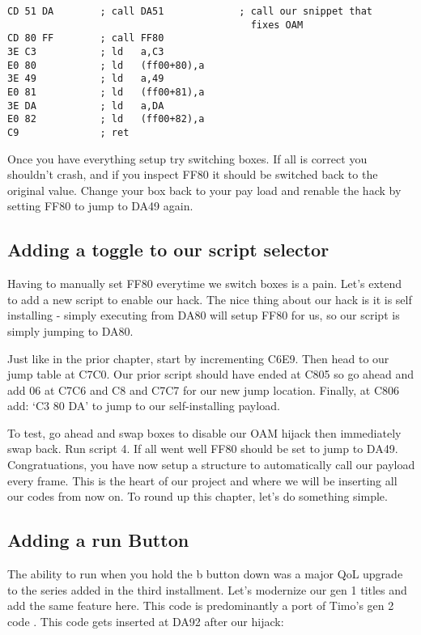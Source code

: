 \documentclass[../main.tex]{subfiles}
\begin{document}
    \begin{verbatim}
CD 51 DA        ; call DA51             ; call our snippet that
                                          fixes OAM
CD 80 FF        ; call FF80
3E C3           ; ld   a,C3
E0 80           ; ld   (ff00+80),a
3E 49           ; ld   a,49
E0 81           ; ld   (ff00+81),a
3E DA           ; ld   a,DA
E0 82           ; ld   (ff00+82),a
C9              ; ret  
    \end{verbatim}

    Once you have everything setup try switching boxes.  If all is correct you shouldn't crash, and if you inspect FF80 it should be switched back to the original value.  Change your box back to your pay load and renable the hack by setting FF80 to jump to DA49 again.

    \subsection{Adding a toggle to our script selector}
    Having to manually set FF80 everytime we switch boxes is a pain.  Let's extend \timos{} to add a new script to enable our hack.  The nice thing about our hack is it is self installing - simply executing from DA80 will setup FF80 for us, so our script is simply jumping to DA80.

    Just like in the prior chapter, start by incrementing C6E9.  Then head to our jump table at C7C0.  Our prior script should have ended at C805 so go ahead and add 06 at C7C6 and C8 and C7C7 for our new jump location.  Finally, at C806 add: `C3 80 DA' to jump to our self-installing payload.

    To test, go ahead and swap boxes to disable our OAM hijack then immediately swap back.  Run script 4.  If all went well FF80 should be set to jump to DA49.  Congratuations, you have now setup a structure to automatically call our payload every frame.  This is the heart of our project and where we will be inserting all our codes from now on.  To round up this chapter, let's do something simple.

    \subsection{Adding a run Button}
    The ability to run when you hold the b button down was a major QoL upgrade to the series added in the third installment.  Let's modernize our gen 1 titles and add the same feature here.  This code is predominantly a port of Timo's gen 2 code \cite{runbutton}.  This code gets inserted at DA92 after our hijack:
\end{document}
